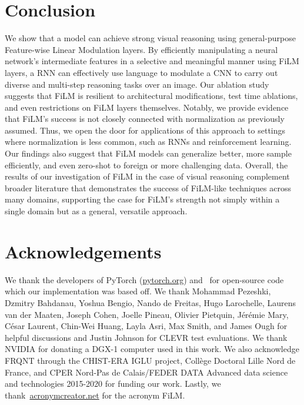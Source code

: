 \documentclass[letterpaper]{article} \usepackage{aaai18}  \usepackage{times}  \usepackage{helvet}  \usepackage{courier}  \usepackage{url}  \usepackage{graphicx}  \frenchspacing  \setlength{\pdfpagewidth}{8.5in}  \setlength{\pdfpageheight}{11in}
\begin{document}
\section{Conclusion} \label{conclusion}
	We show that a model can achieve strong visual reasoning using general-purpose Feature-wise Linear Modulation layers. By efficiently manipulating a neural network's intermediate features in a selective and meaningful manner using FiLM layers, a RNN can effectively use language to modulate a CNN to carry out diverse and multi-step reasoning tasks over an image.
    Our ablation study suggests that FiLM is resilient to architectural modifications, test time ablations, and even restrictions on FiLM layers themselves.
    Notably, we provide evidence that FiLM's success is not closely connected with normalization as previously assumed.
    Thus, we open the door for applications of this approach to settings where normalization is less common, such as RNNs and reinforcement learning.
    Our findings also suggest that FiLM models can generalize better, more sample efficiently, and even zero-shot to foreign or more challenging data.
    Overall, the results of our investigation of FiLM in the case of visual reasoning complement broader literature that demonstrates the success of FiLM-like techniques across many domains, supporting the case for FiLM's strength not simply within a single domain but as a general, versatile approach.

\section{Acknowledgements}
We thank the developers of PyTorch (\url{pytorch.org}) and~\cite{IEP} for open-source code which our implementation was based off. We thank Mohammad Pezeshki, Dzmitry Bahdanau, Yoshua Bengio, Nando de Freitas, Hugo Larochelle, Laurens van der Maaten, Joseph Cohen, Joelle Pineau, Olivier Pietquin, J\'er\'emie Mary, C\'esar Laurent, Chin-Wei Huang, Layla Asri, Max Smith, and James Ough for helpful discussions and Justin Johnson for CLEVR test evaluations. We thank NVIDIA for donating a DGX-1 computer used in this work. We also acknowledge FRQNT through the CHIST-ERA IGLU project, Coll\`ege Doctoral Lille Nord de France, and CPER Nord-Pas de Calais/FEDER DATA Advanced data science and technologies 2015-2020 for funding our work. Lastly, we thank~\url{acronymcreator.net} for the acronym FiLM.

\fontsize{9.0pt}{10.0pt} \selectfont


\end{document}
